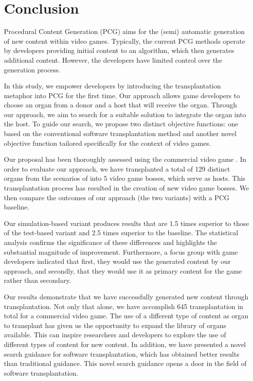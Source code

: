 \section{Conclusion}
\label{sec:Conclusion}

Procedural Content Generation (PCG) aims for the (semi) automatic generation of new content within video games.  Typically, the current PCG methods operate by developers providing initial content to an algorithm, which then generates additional content. However, the developers have limited control over the generation process.

In this study, we empower developers by introducing the transplantation metaphor into PCG for the first time. Our approach allows game developers to choose an organ from a donor and a host that will receive the organ. Through our approach, we aim to search for a suitable solution to integrate the organ into the host. To guide our search, we propose two distinct objective functions: one based on the conventional software transplantation method and another novel objective function tailored specifically for the context of video games.

Our proposal has been thoroughly assessed using the commercial video game \CaseStudy{}. In order to evaluate our approach, we have transplanted a total of 129 distinct organs from the scenarios of \CaseStudy{} into 5 video game bosses, which serve as hosts. This transplantation process has resulted in the creation of new video game bosses. We then compare the outcomes of our approach (the two variants) with a PCG baseline.

Our simulation-based variant produces results that are 1.5 times superior to those of the test-based variant and 2.5 times superior to the baseline. The statistical analysis confirms the significance of these differences and highlights the substantial magnitude of improvement.
Furthermore, a focus group with game developers indicated that first, they would use the generated content by our approach, and secondly, that they would use it as primary content for the game rather than secondary.

Our results demonstrate that we have successfully generated new content through transplantation. Not only that alone, we have accomplish 645 transplantation in total for a commercial video game. The use of a different type of content as organ to transplant has given us the opportunity to expand the library of organs available. This can inspire researchers and developers to explore the use of different types of content for new content. 
In addition, we have presented a novel search guidance for software transplantation, which has obtained better results than traditional guidance. This novel search guidance opens a door in the field of software transplantation.


